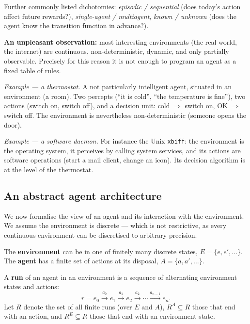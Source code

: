 \documentclass[11pt,a4paper]{article}
\theoremstyle{definition}
\providecommand{\uv}[1]{``#1''}
\begin{document}
Further commonly listed dichotomies: \emph{episodic / sequential} (does today's action affect
future rewards?), \emph{single-agent / multiagent}, \emph{known / unknown} (does the agent know the
transition function in advance?).

\textbf{An unpleasant observation:} most interesting environments (the real world, the internet)
are continuous, non-deterministic, dynamic, and only partially observable. Precisely for this
reason it is not enough to program an agent as a fixed table of rules.

\medskip
\noindent\emph{Example --- a thermostat.} A not particularly intelligent agent, situated in an
environment (a room). Two percepts (\uv{it is cold}, \uv{the temperature is fine}), two actions
(switch on, switch off), and a decision unit: cold $\Rightarrow$ switch on, OK $\Rightarrow$ switch
off. The environment is nevertheless non-deterministic (someone opens the door).

\noindent\emph{Example --- a software daemon.} For instance the Unix \texttt{xbiff}: the
environment is the operating system, it perceives by calling system services, and its actions are
software operations (start a mail client, change an icon). Its decision algorithm is at the level
of the thermostat.

\subsection{An abstract agent architecture}

We now formalise the view of an agent and its interaction with the environment. We assume the
environment is discrete --- which is not restrictive, as every continuous environment can be
discretised to arbitrary precision.

\begin{defbox}
The \textbf{environment} can be in one of finitely many discrete states,
$E = \{e, e', \dots\}$. The \textbf{agent} has a finite set of actions at its disposal,
$A = \{a, a', \dots\}$.

A \textbf{run} of an agent in an environment is a sequence of alternating environment states and
actions:
\[
r = e_0 \xrightarrow{a_0} e_1 \xrightarrow{a_1} e_2 \xrightarrow{a_2} \cdots
\xrightarrow{a_{n-1}} e_n .
\]
Let $R$ denote the set of all finite runs (over $E$ and $A$), $R^A \subseteq R$ those that end
with an action, and $R^E \subseteq R$ those that end with an environment state.
\end{defbox}
\end{document}

